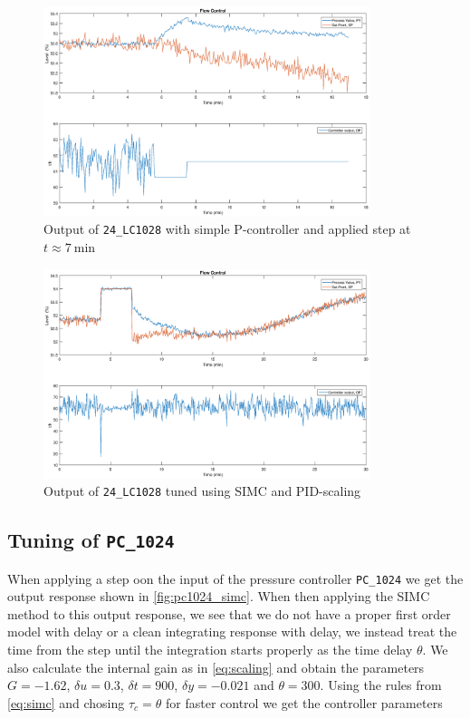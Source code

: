 \begin{figure}[ht!]
	\centering
	\includegraphics[width=0.85\textwidth]{fig/tuning/LC1028_simc.eps}
	\caption{Output of \texttt{24\_LC1028} with simple P-controller and applied step at $t \approx \SI{7}{\minute}$}
	\label{fig:lc1028_simc}
\end{figure}

\begin{figure}[ht!]
	\centering
	\includegraphics[width=0.85\textwidth]{fig/tuning/LC1028_tuned.eps}
	\caption{Output of \texttt{24\_LC1028} tuned using SIMC and PID-scaling}
	\label{fig:lc1028_tuned}
\end{figure}


\subsection{Tuning of \texttt{PC\_1024}}
When applying a step oon the input of the pressure controller \texttt{PC\_1024} we get the output response shown in \autoref{fig:pc1024_simc}. When then applying the SIMC method to this output response, we see that we do not have a proper first order model with delay or a clean integrating response with delay, we instead treat the time from the step until the integration starts properly as the time delay $\theta$. We also calculate the internal gain as in \eqref{eq:scaling} and obtain the parameters $G = -1.62$, $\delta u = 0.3$, $\delta t = 900$, $\delta y = -0.021$ and $\theta = 300$. Using the rules from \eqref{eq:simc} and chosing $\tau_c = \theta$ for faster control we get the controller parameters

